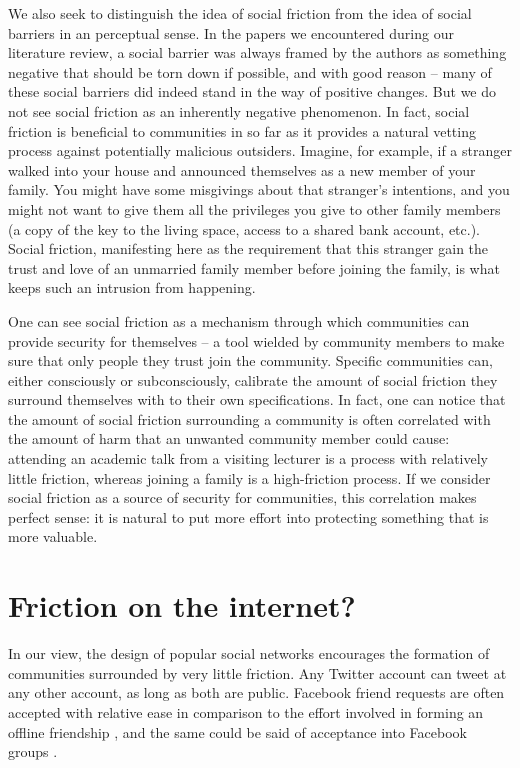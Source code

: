 \documentclass[sigconf,authordraft]{acmart}
\begin{document}
We also seek to distinguish the idea of social friction from the idea of social barriers in an perceptual sense. In the papers we encountered during our literature review, a social barrier was always framed by the authors as something negative that should be torn down if possible, and with good reason -- many of these social barriers did indeed stand in the way of positive changes. But we do not see social friction as an inherently negative phenomenon. In fact, social friction is beneficial to communities in so far as it provides a natural vetting process against potentially malicious outsiders. Imagine, for example, if a stranger walked into your house and announced themselves as a new member of your family. You might have some misgivings about that stranger's intentions, and you might not want to give them all the privileges you give to other family members (a copy of the key to the living space, access to a shared bank account, etc.). Social friction, manifesting here as the requirement that this stranger gain the trust and love of an unmarried family member before joining the family, is what keeps such an intrusion from happening. 


One can see social friction as a mechanism through which communities can provide security for themselves -- a tool wielded by community members to make sure that only people they trust join the community. Specific communities can, either consciously or subconsciously, calibrate the amount of social friction they surround themselves with to their own specifications. In fact, one can notice that the amount of social friction surrounding a community is often correlated with the amount of harm that an unwanted community member could cause: attending an academic talk from a visiting lecturer is a process with relatively little friction, whereas joining a family is a high-friction process. If we consider social friction as a source of security for communities, this correlation makes perfect sense: it is natural to put more effort into protecting something that is more valuable.

\section{Friction on the internet?}

In our view, the design of popular social networks encourages the formation of communities surrounded by very little friction. Any Twitter account can tweet at any other account, as long as both are public. Facebook friend requests are often accepted with relative ease in comparison to the effort involved in forming an offline friendship \cite{rashtian2014befriend}, and the same could be said of acceptance into Facebook groups \cite{park2009being}. 
\end{document}
